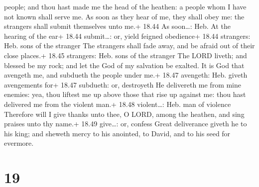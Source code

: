 people; and thou hast made me the head of the heathen: a people whom I
have not known shall serve me.  As soon as they hear of me,
they shall obey me: the strangers shall submit themselves unto me.+
18.44 As soon\ldots: Heb. At the hearing of the ear+ 18.44 submit\ldots:
or, yield feigned obedience+ 18.44 strangers: Heb. sons of the stranger
 The strangers shall fade away, and be afraid out of their
close places.+ 18.45 strangers: Heb. sons of the stranger 
The LORD liveth; and blessed be my rock; and let the God of my salvation
be exalted.  It is God that avengeth me, and subdueth the
people under me.+ 18.47 avengeth: Heb. giveth avengements for+ 18.47
subdueth: or, destroyeth  He delivereth me from mine
enemies: yea, thou liftest me up above those that rise up against me:
thou hast delivered me from the violent man.+ 18.48 violent\ldots: Heb.
man of violence  Therefore will I give thanks unto thee, O
LORD, among the heathen, and sing praises unto thy name.+ 18.49
give\ldots: or, confess  Great deliverance giveth he to his
king; and sheweth mercy to his anointed, to David, and to his seed for
evermore.

\hypertarget{section-18}{%
\section{19}\label{section-18}}

